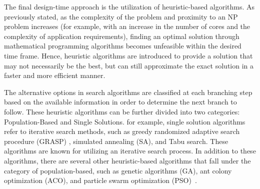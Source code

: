 The final design-time approach is the utilization of heuristic-based algorithms. As previously stated, as the complexity of the problem and proximity to an NP problem increases (for example, with an increase in the number of cores and the complexity of application requirements), finding an optimal solution through mathematical programming algorithms becomes unfeasible within the desired time frame. Hence, heuristic algorithms are introduced to provide a solution that may not necessarily be the best, but can still approximate the exact solution in a faster and more efficient manner.







The alternative options in search algorithms are classified at each branching step based on the available information in order to determine the next branch to follow. These heuristic algorithms can be further divided into two categories: Population-Based and Single Solutions. for example, single solution algorithms refer to iterative search methods, such as greedy randomized adaptive search procedure (GRASP) \cite{pascual2011optimization}, simulated annealing (SA)\cite{giannopoulou2014mapping}, and Tabu search\cite{braun2001comparison}. These algorithms are known for utilizing an iterative search process. In addition to these algorithms, there are several other heuristic-based algorithms that fall under the category of population-based, such as genetic algorithms (GA)\cite{gan2016minimizing}, ant colony optimization (ACO)\cite{ferrandi2010ant}, and particle swarm optimization (PSO)~\cite{xu2016set}.





